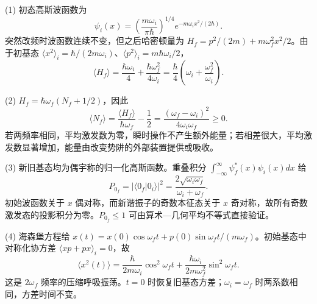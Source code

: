 (1) 初态高斯波函数为
\[
\psi_i(x)=\left(\frac{m\omega_i}{\pi\hbar}\right)^{1/4}
e^{-m\omega_i x^2/(2\hbar)}.
\]
突然改频时波函数连续不变，但之后哈密顿量为 \(H_f=p^2/(2m)+m\omega_f^2x^2/2\)。由于初基态 \(\langle x^2\rangle_i=\hbar/(2m\omega_i)\)、\(\langle p^2\rangle_i=m\hbar\omega_i/2\)，
\[
\langle H_f\rangle=\frac{\hbar\omega_i}{4}+\frac{\hbar\omega_f^2}{4\omega_i}
=\frac\hbar4\left(\omega_i+\frac{\omega_f^2}{\omega_i}\right).
\]

(2) \(H_f=\hbar\omega_f(N_f+1/2)\)，因此
\[
\langle N_f\rangle=\frac{\langle H_f\rangle}{\hbar\omega_f}-\frac12
=\frac{(\omega_f-\omega_i)^2}{4\omega_i\omega_f}\ge0.
\]
若两频率相同，平均激发数为零，瞬时操作不产生额外能量；若相差很大，平均激发数显著增加，能量由改变势阱的外部装置提供或吸收。

(3) 新旧基态均为偶宇称的归一化高斯函数。重叠积分 \(\int_{-\infty}^\infty\psi_f^*(x)\psi_i(x)dx\) 给
\[
P_{0_f}=|\langle0_f|0_i\rangle|^2
=\frac{2\sqrt{\omega_i\omega_f}}{\omega_i+\omega_f}.
\]
初始波函数关于 \(x\) 偶对称，而新谐振子的奇数本征态关于 \(x\) 奇对称，故所有奇数激发态的投影积分为零。\(P_{0_f}\le1\) 可由算术—几何平均不等式直接验证。

(4) 海森堡方程给 \(x(t)=x(0)\cos\omega_ft+p(0)\sin\omega_ft/(m\omega_f)\)。初始基态中对称化协方差 \(\langle xp+px\rangle_i=0\)，故
\[
\langle x^2(t)\rangle=\frac{\hbar}{2m\omega_i}\cos^2\omega_ft+
\frac{\hbar\omega_i}{2m\omega_f^2}\sin^2\omega_ft .
\]
这是 \(2\omega_f\) 频率的压缩呼吸振荡。\(t=0\) 时恢复旧基态方差；\(\omega_i=\omega_f\) 时两系数相同，方差时间不变。
